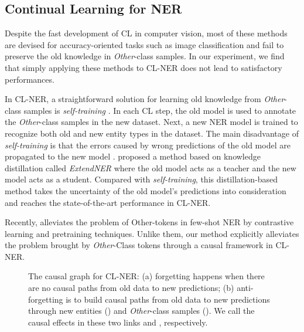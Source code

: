 \documentclass[11pt]{article}
\begin{document}
\subsection{Continual Learning for NER}
Despite the fast development of CL in computer vision, most of these methods \citep{douillard2020podnet,rebuffi2017icarl,hou2019learning} are devised for accuracy-oriented tasks such as image classification and fail to preserve the old knowledge in \textit{Other}-class samples.
In our experiment, we find that simply applying these methods to CL-NER does not lead to satisfactory performances.

In CL-NER, a straightforward solution for learning old knowledge from \textit{Other}-class samples is \textit{self-training} \citep{rosenberg2005semi,de2019continual}.
In each CL step, the old model is used to annotate the \textit{Other}-class samples in the new dataset.
Next, a new NER model is trained to recognize both old and new entity types in the dataset.
The main disadvantage of \textit{self-training} is that the errors caused by wrong predictions of the old model are propagated to the new model \citep{monaikul2021continual}.
\citet{monaikul2021continual} proposed a method based on knowledge distillation \citep{hinton2015distilling} called \textit{ExtendNER} where the old model acts as a teacher and the new model acts as a student.
Compared with \textit{self-training}, this distillation-based method takes the uncertainty of the old model’s predictions into consideration and reaches the state-of-the-art performance in CL-NER. 

Recently, \citet{das-etal-2022-container} alleviates the problem of Other-tokens in few-shot NER by contrastive learning and pretraining techniques.
Unlike them, our method explicitly alleviates the problem brought by \textit{Other}-Class tokens through a causal framework in CL-NER. 


\begin{figure*}[!t]
    \centering
    \caption{The causal graph for CL-NER: (a) forgetting happens when there are no causal paths from old data to new predictions; (b) anti-forgetting is to build causal paths from old data to new predictions through new entities () and \textit{Other}-class samples (). We call the causal effects in these two links  and , respectively.}
\end{figure*}
\end{document}

